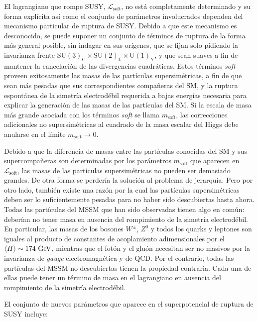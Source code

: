 El lagrangiano que rompe SUSY, $\mathcal{L}_\text{soft}$, no está completamente
determinado y su forma explícita así como el conjunto de parámetros involucrados
dependen del mecanismo particular de ruptura de SUSY. Debido a que este
mecanismo es desconocido, se puede suponer un conjunto de términos de ruptura
de la forma más general posible, sin indagar en sus orígenes, que se fijan solo
pidiendo la invarianza frente $\mathrm{SU}(3)_\mathrm{C} \times \mathrm{SU}(2)_\mathrm{L} \times \mathrm{U}(1)_\mathrm{Y}$,
y que sean suaves a fin de mantener la cancelación de las divergencias
cuadráticas.
Estos términos \emph{soft} proveen exitosamente las masas de las partículas supersimétricas,
a fin de que sean más pesadas que sus correspondientes compañeras del SM, y la
ruptura espontánea de la simetría electrodébil requerida a bajas energías
necesaria para explicar la generación de las masas de las partículas del SM.
Si la escala de masa más grande asociada con los términos \emph{soft} se llama
$m_\text{soft}$, las correcciones adicionales no supersimétricas al cuadrado de
la masa escalar del Higgs debe anularse en el límite $m_\text{soft} \to 0$.

Debido a que la diferencia de masas entre las partículas conocidas del SM y sus
supercompañeras son determinadas por los parámetros $m_\text{soft}$ que
aparecen en $\mathcal{L}_\text{soft}$, las masas de las partículas
supersimétricas no pueden ser demasiado grandes. De otra forma se perdería la
solución al problema de jerarquía.
Pero por otro lado, también existe una razón por la cual las partículas
supersimétricas deben ser lo suficientemente pesadas para no haber sido
descubiertas hasta ahora. Todas las partículas del MSSM que han sido
observadas tienen algo en común: deberían no tener masa en ausencia del
rompimiento de la simetría electrodébil. En particular, las masas de los
bosones $W^\pm$, $Z^0$ y todos los quarks y leptones son iguales al producto de
constantes de acoplamiento adimensionales por el $\avg{H} \sim 174 \gev$,
mientras que el fotón y el gluón necesitan ser no masivos por la invarianza de
\emph{gauge} electromagnética y de QCD. Por el contrario, todas las partículas del MSSM
no descubiertas tienen la propiedad contraria. Cada una de ellas puede tener un
término de masa en el lagrangiano en ausencia del rompimiento de la simetría
electrodébil.

El conjunto de nuevos parámetros que aparece en el superpotencial de ruptura de SUSY incluye\cite{PDG,Haber:1993wf}:

